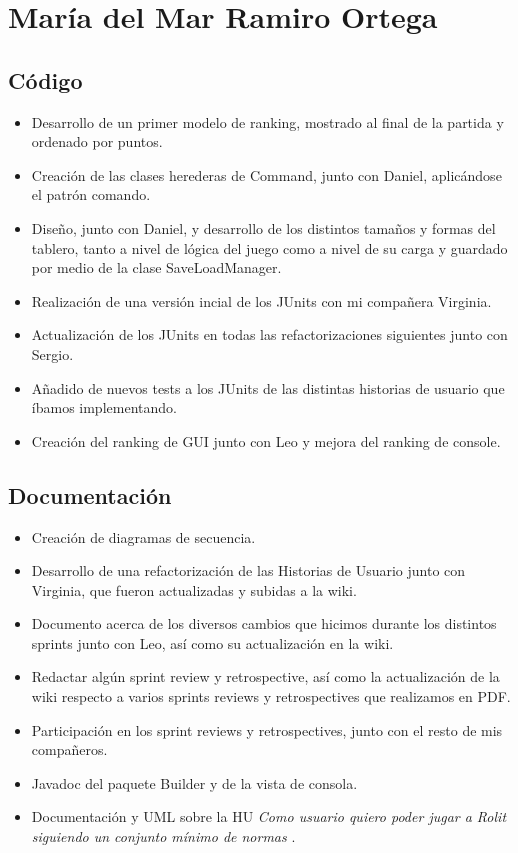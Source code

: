 \documentclass[../FINAL/Scrum/SCRUM.tex]{subfiles}
\begin{document}
\section{María del Mar Ramiro Ortega}
\subsection*{Código}
\begin{itemize}
\item Desarrollo de un primer modelo de ranking, mostrado al final de la partida y ordenado por puntos.
\item Creación de las clases herederas de Command, junto con Daniel, aplicándose el patrón comando.
\item Diseño, junto con Daniel, y desarrollo de los distintos tamaños y formas del tablero, tanto a nivel de lógica del juego como a nivel de su carga y guardado por medio de la clase SaveLoadManager.
\item Realización de una versión incial de los JUnits con mi compañera Virginia.
\item Actualización de los JUnits en todas las refactorizaciones siguientes junto con Sergio.
\item Añadido de nuevos tests a los JUnits de las distintas historias de usuario que íbamos implementando.
\item Creación del ranking de GUI junto con Leo y mejora del ranking de console.
\end{itemize}

\subsection*{Documentación}
\begin{itemize}
\item Creación de diagramas de secuencia.
\item Desarrollo de una refactorización de las Historias de Usuario junto con Virginia, que fueron actualizadas y subidas a la wiki.
\item Documento acerca de los diversos cambios que hicimos durante los distintos sprints junto con Leo, así como su actualización en la wiki.
\item Redactar algún sprint review y retrospective, así como la actualización de la wiki respecto a varios sprints reviews y retrospectives que realizamos en PDF.
\item Participación en los sprint reviews y retrospectives, junto con el resto de mis compañeros.
\item Javadoc del paquete Builder y de la vista de consola.
\item Documentación y UML sobre la HU \textit{Como usuario quiero poder jugar a Rolit siguiendo un conjunto mínimo de normas }.
\end{itemize}
\end{document}
